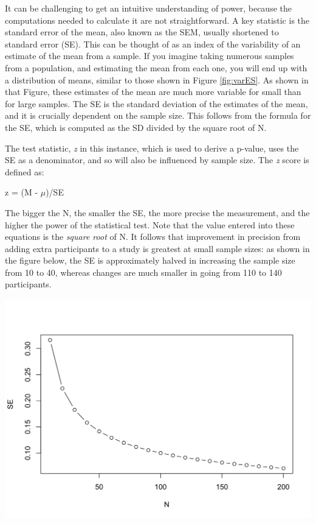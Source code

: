 \documentclass{krantz}
\begin{document}
\begin{tcolorbox}[enhanced,breakable,colback=Black!5!lightgray,colframe=black!75!black,coltitle=white,title=Standard error of the mean]
It can be challenging to get an intuitive understanding of power, because the computations needed to calculate it are not straightforward. A key statistic is the standard error of the mean, also known as the SEM, usually shortened to standard error (SE). This can be thought of as an index of the variability of an estimate of the mean from a sample. If you imagine taking numerous samples from a population, and estimating the mean from each one, you will end up with a distribution of means, similar to those shown in Figure \ref{fig:varES}. As shown in that Figure, these estimates of the mean are much more variable for small than for large samples. The SE is the standard deviation of the estimates of the mean, and it is crucially dependent on the sample size.
This follows from the formula for the SE, which is computed as the SD divided by the square root of N.

The test statistic, \emph{z} in this instance, which is used to derive a p-value, uses the SE as a denominator, and so will also be influenced by sample size. The \emph{z} score is defined as:

z = (M - \(\mu\))/SE

The bigger the N, the smaller the SE, the more precise the measurement, and the higher the power of the statistical test. Note that the value entered into these equations is the \emph{square root} of N. It follows that improvement in precision from adding extra participants to a study is greatest at small sample sizes: as shown in the figure below, the SE is approximately halved in increasing the sample size from 10 to 40, whereas changes are much smaller in going from 110 to 140 participants.

\includegraphics[width=0.6\linewidth]{images_bw/demoSE}\label{SEMbyN}
\end{tcolorbox}
\end{document}
